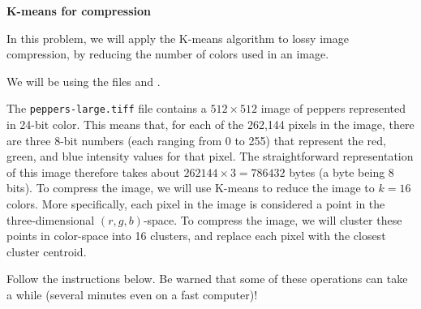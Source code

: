 \item {} {\bf K-means for compression}

In this problem, we will apply the K-means algorithm to lossy image
compression, by reducing the number of colors used in an image.

We will be using the files  and .
	

The \texttt{peppers-large.tiff} file contains
a $512 \times 512$ image of peppers represented in 24-bit color. This means
that, for each of the 262,144 pixels in the image, there are three
8-bit numbers (each ranging from 0 to 255) that represent the red,
green, and blue intensity values for that pixel. The straightforward
representation of this image therefore takes about $262144 \times 3 =
786432$ bytes (a byte being 8 bits). To compress the image, we will
use K-means to reduce the image to $k = 16$ colors. More specifically,
each pixel in the image is considered a point in the three-dimensional
$(r, g, b)$-space. To compress the image, we will cluster these points
in color-space into 16 clusters, and replace each pixel with the
closest cluster centroid.

Follow the instructions below. Be warned that some of these operations
can take a while (several minutes even on a fast computer)!


\begin{enumerate}

  
\ifnum{} {
  
} \fi


  

\ifnum{} {
  
} \fi

\end{enumerate}

